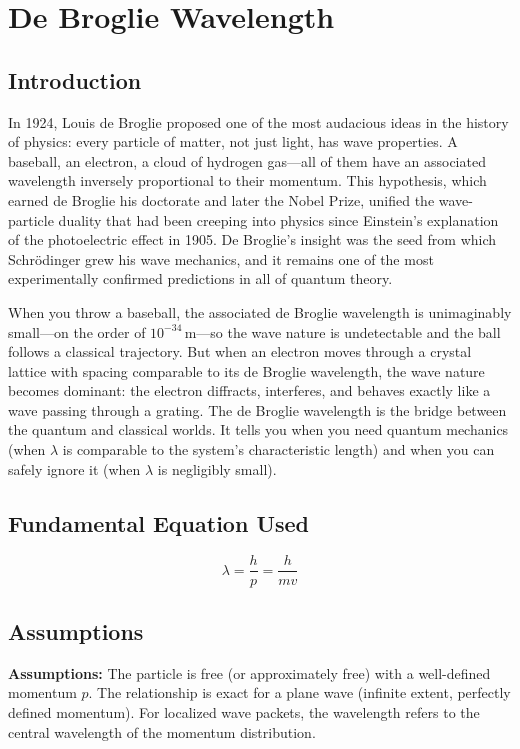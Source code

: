 \chapter{De Broglie Wavelength}

\section*{Introduction}

In 1924, Louis de Broglie proposed one of the most audacious ideas in the history of physics: every particle of matter, not just light, has wave properties. A baseball, an electron, a cloud of hydrogen gas---all of them have an associated wavelength inversely proportional to their momentum. This hypothesis, which earned de Broglie his doctorate and later the Nobel Prize, unified the wave-particle duality that had been creeping into physics since Einstein's explanation of the photoelectric effect in 1905. De Broglie's insight was the seed from which Schrödinger grew his wave mechanics, and it remains one of the most experimentally confirmed predictions in all of quantum theory.

When you throw a baseball, the associated de Broglie wavelength is unimaginably small---on the order of $10^{-34}\,\text{m}$---so the wave nature is undetectable and the ball follows a classical trajectory. But when an electron moves through a crystal lattice with spacing comparable to its de Broglie wavelength, the wave nature becomes dominant: the electron diffracts, interferes, and behaves exactly like a wave passing through a grating. The de Broglie wavelength is the bridge between the quantum and classical worlds. It tells you when you need quantum mechanics (when $\lambda$ is comparable to the system's characteristic length) and when you can safely ignore it (when $\lambda$ is negligibly small).
\section*{Fundamental Equation Used}

\begin{equation}
\lambda = \frac{h}{p} = \frac{h}{mv}
\end{equation}
\section*{Assumptions}

\textbf{Assumptions:} The particle is free (or approximately free) with a well-defined momentum $p$. The relationship is exact for a plane wave (infinite extent, perfectly defined momentum). For localized wave packets, the wavelength refers to the central wavelength of the momentum distribution.



